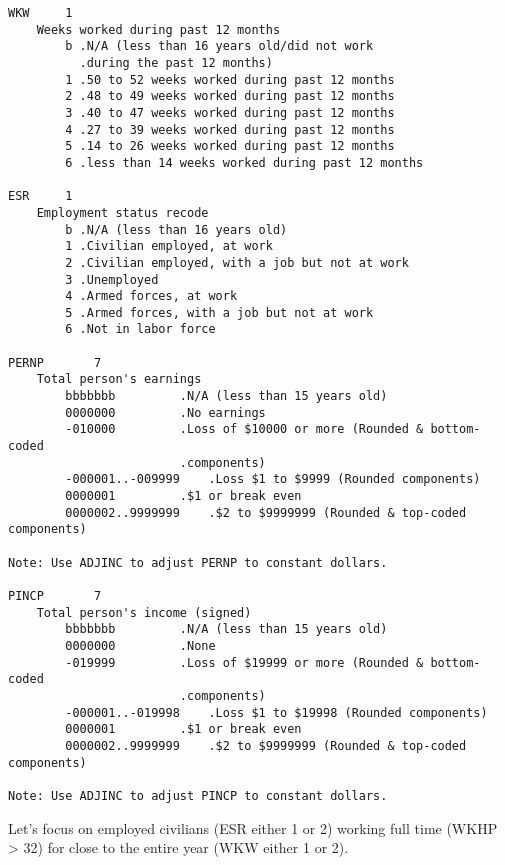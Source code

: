 \documentclass[]{book}
\newenvironment{Shaded}{\begin{snugshade}}{\end{snugshade}}
\newcommand{\KeywordTok}[1]{\textcolor[rgb]{0.13,0.29,0.53}{\textbf{{#1}}}}
\newcommand{\DecValTok}[1]{\textcolor[rgb]{0.00,0.00,0.81}{{#1}}}
\newcommand{\StringTok}[1]{\textcolor[rgb]{0.31,0.60,0.02}{{#1}}}
\newcommand{\CommentTok}[1]{\textcolor[rgb]{0.56,0.35,0.01}{\textit{{#1}}}}
\newcommand{\NormalTok}[1]{{#1}}
\theoremstyle{definition}
\theoremstyle{definition}
\theoremstyle{remark}
\begin{document}
\begin{verbatim}
WKW     1   
    Weeks worked during past 12 months
        b .N/A (less than 16 years old/did not work 
          .during the past 12 months)
        1 .50 to 52 weeks worked during past 12 months
        2 .48 to 49 weeks worked during past 12 months
        3 .40 to 47 weeks worked during past 12 months
        4 .27 to 39 weeks worked during past 12 months
        5 .14 to 26 weeks worked during past 12 months 
        6 .less than 14 weeks worked during past 12 months
        
ESR     1   
    Employment status recode
        b .N/A (less than 16 years old)
        1 .Civilian employed, at work
        2 .Civilian employed, with a job but not at work
        3 .Unemployed
        4 .Armed forces, at work
        5 .Armed forces, with a job but not at work
        6 .Not in labor force
        
PERNP       7   
    Total person's earnings
        bbbbbbb         .N/A (less than 15 years old)
        0000000         .No earnings
        -010000         .Loss of $10000 or more (Rounded & bottom-coded 
                        .components) 
        -000001..-009999    .Loss $1 to $9999 (Rounded components)
        0000001         .$1 or break even
        0000002..9999999    .$2 to $9999999 (Rounded & top-coded components)
        
Note: Use ADJINC to adjust PERNP to constant dollars.

PINCP       7   
    Total person's income (signed)
        bbbbbbb         .N/A (less than 15 years old)
        0000000         .None
        -019999         .Loss of $19999 or more (Rounded & bottom-coded 
                        .components) 
        -000001..-019998    .Loss $1 to $19998 (Rounded components)
        0000001         .$1 or break even
        0000002..9999999    .$2 to $9999999 (Rounded & top-coded components)
            
Note: Use ADJINC to adjust PINCP to constant dollars.
\end{verbatim}

Let's focus on employed civilians (ESR either 1 or 2) working full time
(WKHP \textgreater{} 32) for close to the entire year (WKW either 1 or
2).

\begin{Shaded}
\end{Shaded}
\end{document}
